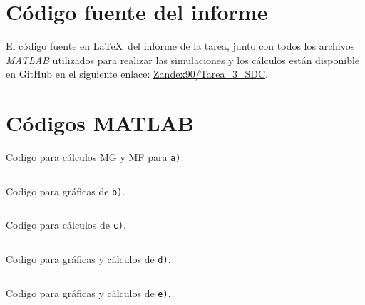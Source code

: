 \section{Código fuente del informe}
El código fuente en \LaTeX\ del informe de la tarea, junto con todos los archivos
\textit{MATLAB} utilizados para realizar las simulaciones y los cálculos están
disponible en GitHub en el siguiente enlace:
\href{https://github.com/Zandex90/Tarea_3_SDC}{Zandex90/Tarea\_3\_SDC}.
\section{Códigos MATLAB}



\begin{longlisting}
  \caption{Codigo para cálculos MG y MF para \texttt{a)}.}
  \inputminted[lastline=16]{Matlab}{matlab/Problema_A.m}
  \label{lst:Cod_problema_A}
\end{longlisting}


\begin{longlisting}
  \caption{Codigo para gráficas de \texttt{b)}.}
  \inputminted{Matlab}{matlab/problema_b.m}
  \label{lst:prob-b}
\end{longlisting}


\begin{longlisting}
  \caption{Codigo para cálculos de \texttt{c)}.}
  \inputminted[firstline=18]{Matlab}{matlab/Problema_A.m}
  \label{lst:prob-c}
\end{longlisting}



\begin{longlisting}
  \caption{Codigo para gráficas y cálculos de \texttt{d)}.}
  \inputminted{Matlab}{matlab/problema_d.m}
  \label{lst:prob-d}
\end{longlisting}


\begin{longlisting}
  \caption{Codigo para gráficas y cálculos de \texttt{e)}.}
  \inputminted{Matlab}{matlab/problema_e.m}
  \label{lst:prob-e}
\end{longlisting}


